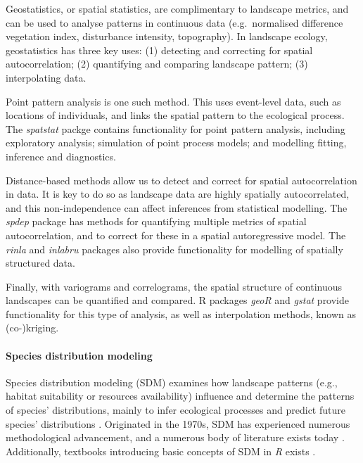 \documentclass[smallextended]{svjour3}       %
\begin{document}
Geostatistics, or spatial statistics, are complimentary to landscape metrics, and can be used to analyse patterns in continuous data (e.g.~normalised difference vegetation index, disturbance intensity, topography).
In landscape ecology, geostatistics has three key uses: (1) detecting and correcting for spatial autocorrelation; (2) quantifying and comparing landscape pattern; (3) interpolating data.

Point pattern analysis is one such method.
This uses event-level data, such as locations of individuals, and links the spatial pattern to the ecological process.
The \emph{spatstat} packge contains functionality for point pattern analysis, including exploratory analysis; simulation of point process models; and modelling fitting, inference and diagnostics.

Distance-based methods allow us to detect and correct for spatial autocorrelation in data.
It is key to do so as landscape data are highly spatially autocorrelated, and this non-independence can affect inferences from statistical modelling.
The \emph{spdep} package has methods for quantifying multiple metrics of spatial autocorrelation, and to correct for these in a spatial autoregressive model.
The \emph{rinla} and \emph{inlabru} packages also provide functionality for modelling of spatially structured data.

Finally, with variograms and correlograms, the spatial structure of continuous landscapes can be quantified and compared.
R packages \emph{geoR} and \emph{gstat} provide functionality for this type of analysis, as well as interpolation methods, known as (co-)kriging.

\hypertarget{sec:SDM}{%
\paragraph{Species distribution modeling}\label{sec:SDM}}

Species distribution modeling (SDM) examines how landscape patterns (e.g., habitat suitability or resources availability) influence and determine the patterns of species' distributions, mainly to infer ecological processes and predict future species' distributions \cite{Wiersma2011}.
Originated in the 1970s, SDM has experienced numerous methodological advancement, and a numerous body of literature exists today \cite{Zimmermann2010,Norberg2019}.
Additionally, textbooks introducing basic concepts of SDM in \emph{R} exists \cite{Guisan2017,Fletcher2019}.
\end{document}
